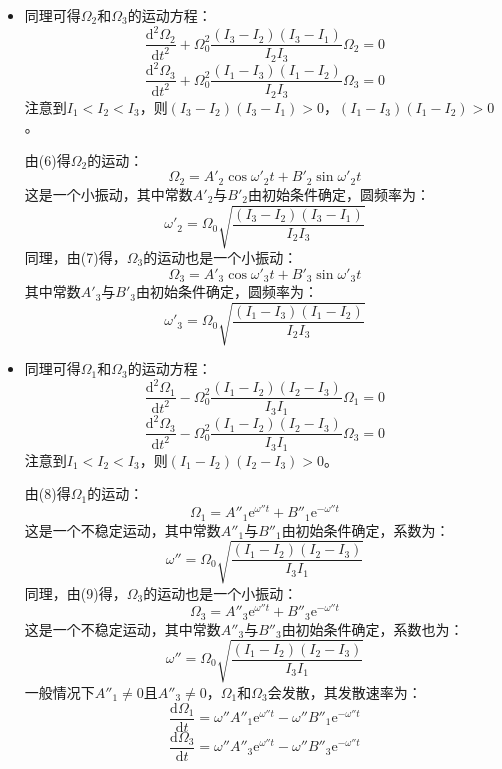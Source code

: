 \documentclass[a4paper,fontset=windows]{ctexart}
\begin{document}
\begin{itemize}
        \medskip
        \item[7.(c)]
        同理可得$\varOmega_2$和$\varOmega_3$的运动方程：
        \begin{equation}
        \frac{\mathrm{d}^2\varOmega_2}{\mathrm{d}t^2} + \varOmega_0^2\frac{(I_3-I_2)(I_3-I_1)}{I_2I_3}\varOmega_2 = 0
        \end{equation}
        \begin{equation}
        \frac{\mathrm{d}^2\varOmega_3}{\mathrm{d}t^2} + \varOmega_0^2\frac{(I_1-I_3)(I_1-I_2)}{I_2I_3}\varOmega_3 = 0
        \end{equation}
        注意到$I_1<I_2<I_3$，则$(I_3-I_2)(I_3-I_1)>0$，$(I_1-I_3)(I_1-I_2)>0$。

        由(6)得$\varOmega_2$的运动：
        \[
        \varOmega_2 = A'_2\cos\omega'_2t + B'_2\sin\omega'_2t
        \]
        这是一个小振动，其中常数$A'_2$与$B'_2$由初始条件确定，圆频率为：
        \[
        \omega'_2 = \varOmega_0\sqrt{\frac{(I_3-I_2)(I_3-I_1)}{I_2I_3}}
        \]
        同理，由(7)得，$\varOmega_3$的运动也是一个小振动：
        \[
        \varOmega_3 = A'_3\cos\omega'_3t + B'_3\sin\omega'_3t
        \]
        其中常数$A'_3$与$B'_3$由初始条件确定，圆频率为：
        \[
        \omega'_3 = \varOmega_0\sqrt{\frac{(I_1-I_3)(I_1-I_2)}{I_2I_3}}
        \]

        \medskip
        \item[7.(d)]
        同理可得$\varOmega_1$和$\varOmega_3$的运动方程：
        \begin{equation}
        \frac{\mathrm{d}^2\varOmega_1}{\mathrm{d}t^2} - \varOmega_0^2\frac{(I_1-I_2)(I_2-I_3)}{I_3I_1}\varOmega_1 = 0
        \end{equation}
        \begin{equation}
        \frac{\mathrm{d}^2\varOmega_3}{\mathrm{d}t^2} - \varOmega_0^2\frac{(I_1-I_2)(I_2-I_3)}{I_3I_1}\varOmega_3 = 0
        \end{equation}
        注意到$I_1<I_2<I_3$，则$(I_1-I_2)(I_2-I_3)>0$。

        由(8)得$\varOmega_1$的运动：
        \[
        \varOmega_1 = A''_1\mathrm{e}^{\omega''t} + B''_1\mathrm{e}^{-\omega''t}
        \]
        这是一个不稳定运动，其中常数$A''_1$与$B''_1$由初始条件确定，系数为：
        \[
        \omega'' = \varOmega_0\sqrt{\frac{(I_1-I_2)(I_2-I_3)}{I_3I_1}}
        \]
        同理，由(9)得，$\varOmega_3$的运动也是一个小振动：
        \[
        \varOmega_3 = A''_3\mathrm{e}^{\omega''t} + B''_3\mathrm{e}^{-\omega''t}
        \]
        这是一个不稳定运动，其中常数$A''_3$与$B''_3$由初始条件确定，系数也为：
        \[
        \omega'' = \varOmega_0\sqrt{\frac{(I_1-I_2)(I_2-I_3)}{I_3I_1}}
        \]
        一般情况下$A''_1\neq0$且$A''_3\neq0$，$\varOmega_1$和$\varOmega_3$会发散，其发散速率为：
        \[
        \frac{\mathrm{d}\varOmega_1}{\mathrm{d}t} = \omega''A''_1\mathrm{e}^{\omega''t} - \omega''B''_1\mathrm{e}^{-\omega''t}
        \]
        \[
        \frac{\mathrm{d}\varOmega_3}{\mathrm{d}t} = \omega''A''_3\mathrm{e}^{\omega''t} - \omega''B''_3\mathrm{e}^{-\omega''t}
        \]

    \end{itemize}
\end{document}
